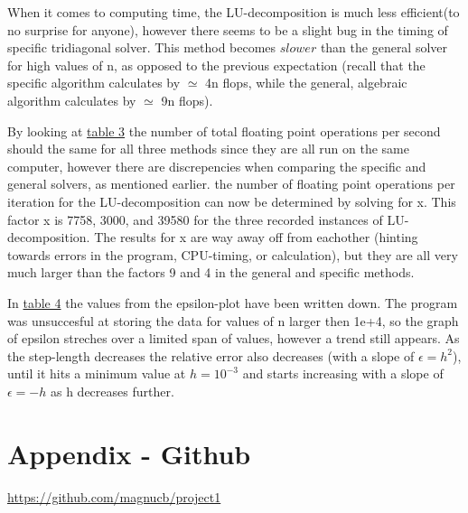 \documentclass[11pt,a4paper,notitlepage]{article}
\begin{document}
When it comes to computing time, the LU-decomposition is much less efficient(to no surprise for anyone), however there seems to be a slight bug in the timing of specific tridiagonal solver. This method becomes $slower$ than the general solver for high values of n, as opposed to the previous expectation (recall that the specific algorithm calculates by $\simeq$ 4n flops, while the general, algebraic algorithm calculates by $\simeq$ 9n flops).
	
By looking at \hyperref[table:flops-per-sec]{table 3} the number of total floating point operations per second should the same for all three methods since they are all run on the same computer, however there are discrepencies when comparing the specific and general solvers, as mentioned earlier. the number of floating point operations per iteration for the LU-decomposition can now be determined by solving for x. This factor x is 7758, 3000, and 39580 for the three recorded instances of LU-decomposition. The results for x are way away off from eachother (hinting towards errors in the program, CPU-timing, or calculation), but they are all very much larger than the factors 9 and 4 in the general and specific methods.

In \hyperref[table:epsilon]{table 4} the values from the epsilon-plot have been written down. 
The program was unsuccesful at storing the data for values of n larger then 1e+4, so the graph of epsilon streches over a limited span of values, however a trend still appears. As the step-length decreases the relative error also decreases (with a slope of $\epsilon = h^2$), until it hits a minimum value at $h=10^{-3}$ and starts increasing with a slope of $\epsilon = -h$ as h decreases further.

\section{Appendix - Github}
\label{section:github}
\hyperref[github-address]{https://github.com/magnucb/project1}
\end{document}
